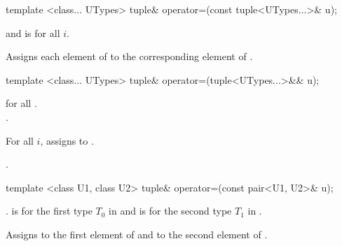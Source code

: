 %
%
\begin{itemdecl}
template <class... UTypes>
  tuple& operator=(const tuple<UTypes...>& u);
\end{itemdecl}

\begin{itemdescr}
\pnum
\requires
{} and
 is  for all $i$.

\pnum
\effects  Assigns each element of  to the corresponding element
of .

\pnum
\returns  {}
\end{itemdescr}

%
%
\begin{itemdecl}
template <class... UTypes>
  tuple& operator=(tuple<UTypes...>&& u);
\end{itemdecl}

\begin{itemdescr}
\pnum
\requires
{} for all .
 \tcode{==}\\.

\pnum
\effects For all $i$, assigns  to
.

\pnum
\returns {}.
\end{itemdescr}

%
%
%
\begin{itemdecl}
template <class U1, class U2> tuple& operator=(const pair<U1, U2>& u);
\end{itemdecl}

\begin{itemdescr}
\pnum
\requires {}.
 is  for the first type $T_0$ in
 and  is  for the
second type $T_1$ in .

\pnum
\effects  Assigns  to the first element of 
and  to the second element of .

\pnum
\returns  {}
\end{itemdescr}

